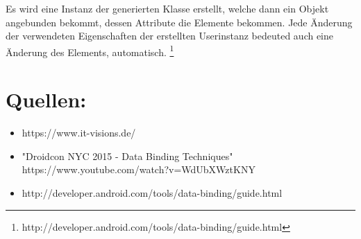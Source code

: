 \documentclass[FIPLY_base.tex]{subfiles}
\begin{document}
Es wird eine Instanz der generierten Klasse erstellt, welche dann ein Objekt angebunden bekommt, dessen Attribute die Elemente bekommen. Jede Änderung der verwendeten Eigenschaften der erstellten Userinstanz bedeuted auch eine Änderung des Elements, automatisch. \footnote{http://developer.android.com/tools/data-binding/guide.html}

\newpage
\section{Quellen:}
\begin{itemize}
	\item https://www.it-visions.de/
	\item "Droidcon NYC 2015 - Data Binding Techniques" \\ https://www.youtube.com/watch?v=WdUbXWztKNY
	\item http://developer.android.com/tools/data-binding/guide.html
\end{itemize}
\end{document}
